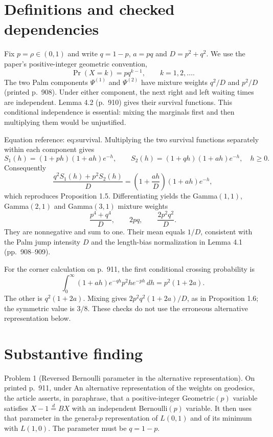 \documentclass[10pt]{article}
\begin{document}
\section*{Definitions and checked dependencies}
Fix \(p=\rho\in(0,1)\) and write \(q=1-p\), \(a=pq\) and \(D=p^2+q^2\). We use the paper’s positive-integer geometric convention, \[\Pr(X=k)=p q^{k-1},\qquad k=1,2,\ldots.\] The two Palm components \(\Psi^{(1)}\) and \(\Psi^{(2)}\) have mixture weights \(q^2/D\) and \(p^2/D\) (printed p. 908). Under either component, the next right and left waiting times are independent. Lemma 4.2 (p. 910) gives their survival functions. This conditional independence is essential: mixing the marginals first and then multiplying them would be unjustified.\par
Equation reference: eq:survival. Multiplying the two survival functions separately within each component gives \[S_1(h)=(1+ph)(1+ah)e^{-h},\qquad
 S_2(h)=(1+qh)(1+ah)e^{-h},\quad h\geq0.\] Consequently \[
 \frac{q^2S_1(h)+p^2S_2(h)}D
 =\left(1+\frac{a h}D\right)(1+ah)e^{-h},\] which reproduces Proposition 1.5. Differentiating yields the Gamma\((1,1)\), Gamma\((2,1)\) and Gamma\((3,1)\) mixture weights \[\frac{p^4+q^4}{D},\qquad 2pq,\qquad \frac{2p^2q^2}{D}.\] They are nonnegative and sum to one. Their mean equals \(1/D\), consistent with the Palm jump intensity \(D\) and the length-bias normalization in Lemma 4.1 (pp. 908–909).\par
For the corner calculation on p. 911, the first conditional crossing probability is \[\int_0^\infty (1+ah)e^{-qh}p^2h e^{-ph}\,dh
 =p^2(1+2a).\] The other is \(q^2(1+2a)\). Mixing gives \(2p^2q^2(1+2a)/D\), as in Proposition 1.6; the symmetric value is \(3/8\). These checks do not use the erroneous alternative representation below.\par
\section*{Substantive finding}
Problem 1 (Reversed Bernoulli parameter in the alternative representation).  On printed p. 911, under An alternative representation of the weights on geodesics, the article asserts, in paraphrase, that a positive-integer Geometric\((p)\) variable satisfies \(X-1\overset d=BX\) with an independent Bernoulli\((p)\) variable. It then uses that parameter in the general-\(p\) representation of \(L(0,1)\) and of its minimum with \(L(1,0)\). The parameter must be \(q=1-p\).\par
\end{document}
